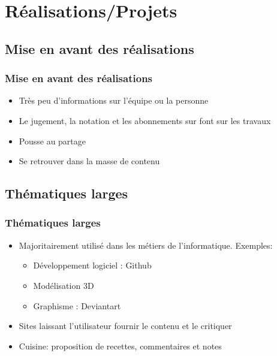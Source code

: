     \section{Réalisations/Projets}

\subsection{Mise en avant des réalisations}
\begin{frame}
\frametitle{Mise en avant des réalisations}
\begin{itemize}
    \itemsep1.5em
    \item Très peu d'informations sur l'équipe ou la personne
    \item Le jugement, la notation et les abonnements sur font sur les travaux
    \item Pousse au partage
    \item Se retrouver dans la masse de contenu
\end{itemize}
\end{frame}

\subsection{Thématiques larges}
\begin{frame}
\frametitle{Thématiques larges}
\begin{itemize}
    \itemsep1.5em
    \item Majoritairement utilisé dans les métiers de l'informatique. Exemples:
        \begin{itemize}
            \item Développement logiciel : Github
            \item Modélisation 3D
            \item Graphisme : Deviantart
        \end{itemize}
    \item Sites laissant l'utilisateur fournir le contenu et le critiquer
    \item Cuisine: proposition de recettes, commentaires et notes
\end{itemize}
\end{frame}
